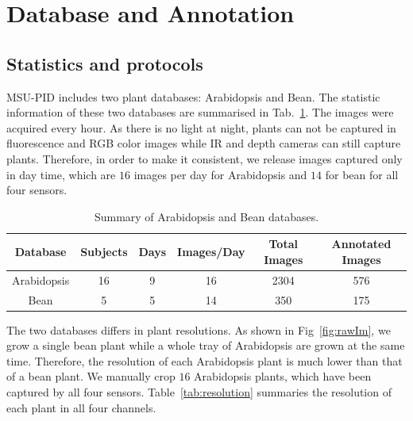 \section{Database and Annotation}
\subsection{Statistics and protocols}
MSU-PID includes two plant databases: Arabidopsis and Bean.
The statistic information of these two databases are summarised in Tab.~\ref{tab:stat}.
The images were acquired every hour.
As there is no light at night, plants can not be captured in fluorescence and RGB color images while IR and depth cameras can still capture plants.
Therefore, in order to make it consistent, we release images captured only in day time, which are $16$ images per day for Arabidopsis and $14$ for bean for all four sensors.

\begin{table}[h]
\begin{center}
\caption{Summary of Arabidopsis and Bean databases.}
\label{tab:stat}
\begin{tabular}{c|c|c|c|c|c}
      \hline
      Database     & Subjects & Days & Images/Day & Total Images & Annotated Images \\
      \hline
      Arabidopsis &  16      &  9   &     16     &     2304     &       576    \\
      Bean        &   5      &  5   &     14     &     350      &       175 \\
      \hline
\end{tabular}
\end{center}
\end{table}

The two databases differs in plant resolutions.
As shown in Fig~\ref{fig:rawIm},  we grow a single bean plant while a whole tray of Arabidopsis are grown at the same time.
Therefore, the resolution of each Arabidopsis plant is much lower than that of a bean plant.
We manually crop $16$ Arabidopsis plants, which have been captured by all four sensors.
Table~\ref{tab:resolution} summaries the resolution of each plant in all four channels.


